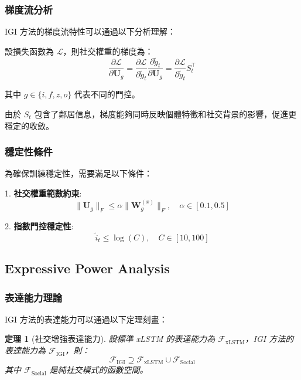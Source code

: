 \documentclass[11pt,a4paper]{article}
\newtheorem{theorem}{定理}
\begin{document}
\subsubsection{梯度流分析}
IGI 方法的梯度流特性可以通過以下分析理解：

設損失函數為 $\mathcal{L}$，則社交權重的梯度為：
\begin{equation}
\frac{\partial \mathcal{L}}{\partial \mathbf{U}_g} = \frac{\partial \mathcal{L}}{\partial \tilde{g}_t} \frac{\partial \tilde{g}_t}{\partial \mathbf{U}_g} = \frac{\partial \mathcal{L}}{\partial \tilde{g}_t} S_t^{\top}
\end{equation}

其中 $g \in \{i, f, z, o\}$ 代表不同的門控。

由於 $S_t$ 包含了鄰居信息，梯度能夠同時反映個體特徵和社交背景的影響，促進更穩定的收斂。

\subsubsection{穩定性條件}
為確保訓練穩定性，需要滿足以下條件：

1. \textbf{社交權重範數約束}:
   \begin{equation}
   \|\mathbf{U}_g\|_F \leq \alpha \|\mathbf{W}_g^{(x)}\|_F, \quad \alpha \in [0.1, 0.5]
   \end{equation}

2. \textbf{指數門控穩定性}:
   \begin{equation}
   \tilde{i}_t \leq \log(C), \quad C \in [10, 100]
   \end{equation}

\subsection{Expressive Power Analysis}

\subsubsection{表達能力理論}
IGI 方法的表達能力可以通過以下定理刻畫：

\begin{theorem}[社交增強表達能力]
設標準 xLSTM 的表達能力為 $\mathcal{F}_{\text{xLSTM}}$，IGI 方法的表達能力為 $\mathcal{F}_{\text{IGI}}$，則：
\begin{equation}
\mathcal{F}_{\text{IGI}} \supseteq \mathcal{F}_{\text{xLSTM}} \cup \mathcal{F}_{\text{Social}}
\end{equation}
其中 $\mathcal{F}_{\text{Social}}$ 是純社交模式的函數空間。
\end{theorem}
\end{document}
